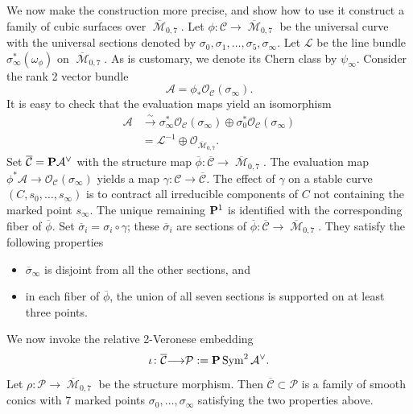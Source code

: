 \documentclass[reqno]{amsart}
\DeclareMathOperator{\M}{\mathcal{M}}
\renewcommand{\to}{{\longrightarrow}}
\renewcommand {\P}{{\bf P}}
\providecommand{\Sym}{\operatorname{Sym}}
\numberwithin{equation}{section}
\renewcommand{\O}{\mathcal{O}}
\begin{document}
We now make the construction more precise, and show how to use it construct a family of cubic surfaces over $\overline {\M}_{0,7}$.
Let $\phi \colon \mathcal{C} \to \overline{\M}_{0,7}$ be the universal curve with the universal sections denoted by $\sigma_0, \sigma_1, \dots, \sigma_5, \sigma_{\infty}$.
Let $\mathcal{L}$ be the line bundle $\sigma_{\infty}^*\left(\omega_{\phi}\right)$ on $\overline{\M}_{0,7}$.
As is customary, we denote its Chern class by $\psi_{\infty}$.
Consider the rank 2 vector bundle
\[ \mathcal{A} = \phi_* \O_{\mathcal{C}}\left(\sigma_{\infty}\right).\]
It is easy to check that the evaluation maps yield an isomorphism
\begin{align*}
  \mathcal{A} &\xrightarrow{\sim} \sigma_{\infty}^*\O_{\mathcal{C}}\left( \sigma_{\infty} \right) \oplus \sigma_0^*\O_{\mathcal{C}}\left( \sigma_{\infty} \right)\\
  &= \mathcal{L}^{-1} \oplus \O_{\overline{\M}_{0,7}}.
\end{align*}
Set $\overline {\mathcal{C}} = \P \mathcal{A}^{\vee}$ with the structure map $\overline{\phi} \colon \overline {\mathcal{C}} \to \overline{\M}_{0,7}$.
The evaluation map $\phi^*\mathcal{A} \to \O_{\mathcal{C}}\left(\sigma_{\infty}\right)$ yields a map $\gamma \colon \mathcal{C} \to \overline {\mathcal{C}}$.
The effect of $\gamma$ on a stable curve $(C, s_0, \dots, s_{\infty})$ is to contract all irreducible components of $C$ not containing the marked point $s_{\infty}$.
The unique remaining $\P^1$ is identified with the corresponding fiber of $\overline{\phi}$.
Set $\overline{\sigma}_i = \sigma_i \circ \gamma$; these $\overline{\sigma}_i$ are sections of $\overline{\phi} \colon \overline {\mathcal{C}} \to \overline{\M}_{0,7}$.
They satisfy the following properties
\begin{itemize}
\item $\overline{\sigma}_{\infty}$ is disjoint from all the other sections, and
\item in each fiber of $\overline{\phi}$, the union of all seven sections
  is supported on at least three points.
\end{itemize}
We now invoke the relative 2-Veronese embedding
\[
\iota \colon \overline {\mathcal{C}} \to \mathcal{P} := \P \Sym^2 \mathcal{A}^{\vee}.
\]
Let $\rho \colon \mathcal{P} \to \overline{\M}_{0,7}$ be the structure morphism.
Then $\overline {\mathcal{C}} \subset \mathcal{P}$ is a family of smooth conics with 7 marked points $\sigma_0, \dots, \sigma_{\infty}$ satisfying the two properties above.
\end{document}
